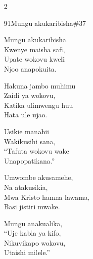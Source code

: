 \documentclass{article}
\begin{document}
\begin{multicols}{2}
\begin{hymn}{91}{Mungu akukaribisha}{\#37}
\begin{stanza}
Mungu akukaribisha\\
Kwenye maisha safi,\\
Upate wokovu kweli\\
Njoo anapokuita.
\end{stanza}
\begin{chorus}
Hakuna jambo muhimu\\
Zaidi ya wokovu,\\
Katika ulimwengu huu\\
Hata ule ujao.
\end{chorus}
\begin{stanza}
Usikie manabii\\
Wakikusihi sana,\\
``Tafuta wokovu wake\\
Unapopatikana.''
\end{stanza}
\begin{stanza}
Umwombe akusamehe,\\
Na atakusikia,\\
Mwa Kristo hamna lawama,\\
Basi jistiri mwake.
\end{stanza}
\begin{stanza}
Mungu anakualika,\\
``Uje kabla ya kifo,\\
Nikuvikapo wokovu,\\
Utaishi milele.''
\end{stanza}
\end{hymn}


\end{multicols}
\end{document}
